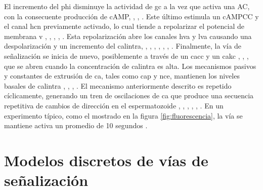 El incremento del \ac{phi} disminuye la actividad de \ac{gc} a la vez que activa una \ac{AC}, con la consecuente producción de \ac{cAMP}, \citeauthor{Nishigaki:2004p4516} \citep{Nishigaki:2004p4516}, \citeauthor{Cook:1993ul} \citep{Cook:1993ul}, \citeauthor{Beltran:1996fd} \citep{Beltran:1996fd}. Este último estimula un \ac{cAMPCC} y el canal \ac{hcn} previamente activado, lo cual tiende a repolarizar el potencial de membrana \acs{v} \citeauthor{Strunker:2006tk} \citep{Strunker:2006tk}, \citeauthor{Kaupp:2003p4518} \citep{Kaupp:2003p4518}, \citeauthor{Nishigaki:2004p4516} \citep{Nishigaki:2004p4516}, \citeauthor{Rodriguez:2003do} \citep{Rodriguez:2003do}, \citeauthor{Gauss:1998de} \citep{Gauss:1998de}. Esta repolarización abre los canales \ac{hva} y \ac{lva} causando una despolarización y un incremento del \ac{calintra}, \citeauthor{Strunker:2006tk} \citep{Strunker:2006tk}, \citeauthor{GranadosGonzalez:2005ia} \citep{GranadosGonzalez:2005ia}, \citeauthor{Kaupp:2003p4518} \citep{Kaupp:2003p4518},\citeauthor{Bohmer:2005ik} \citep{Bohmer:2005ik}, \citeauthor{Wood:2003p4517} \citep{Wood:2003p4517}, \citeauthor{Nishigaki:2004p4516} \citep{Nishigaki:2004p4516}, \citeauthor{Wood:2005gg} \citep{Wood:2005gg}. Finalmente, la vía de señalización se inicia de nuevo, posiblemente a través de un \ac{cacc} y un \ac{cakc} \citeauthor{Wood:2003p4517} \citep{Wood:2003p4517}, \citeauthor{Wood2007} \citep{Wood2007}, \citeauthor{Greenwood:2007hg} \citep{Greenwood:2007hg}, que se abren cuando la concentración de \ac{calintra} es alta. Los mecanismos pasivos y constantes de extrusión de \ac{ca}, tales como \ac{cap} y \ac{nce}, mantienen los niveles basales de \ac{calintra} \citeauthor{Nishigaki:2004p4516} \citep{Nishigaki:2004p4516}, \citeauthor{Su:2002fk} \citep{Su:2002fk}, \citeauthor{Rodriguez:2003do} \citep{Rodriguez:2003do}, \citeauthor{Okunade:2004jw} \citep{Okunade:2004jw}. El mecanismo anteriormente descrito es repetido cíclicamente, generando un tren de oscilaciones de \ac{ca} que produce una secuencia repetitiva de cambios de dirección en el espermatozoide \citeauthor{Guerrero:2010gw}, \citep{Guerrero:2010gw}, \citeauthor{Guerrero:2010gd} \citep{Guerrero:2010gd}, \citeauthor{Bohmer:2005ik} \citep{Bohmer:2005ik}, \citeauthor{Wood:2005gg} \citep{Wood:2005gg}, \citeauthor{Wood2007} \citep{Wood2007}. En un experimento típico, como el mostrado en la figura \ref{fig:fluorescencia}, la vía se mantiene activa un promedio de 10 segundos \citeauthor{Wood:2003p4517} \citep{Wood:2003p4517}.

\section{Modelos discretos de vías de señalización}\label{boolNets}

